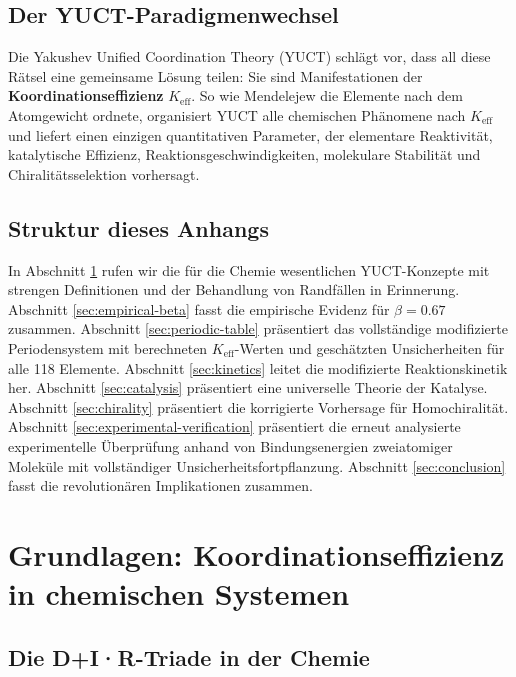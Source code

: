 \documentclass[12pt,a4paper]{article}
\newcommand{\Keff}{K_{\mathrm{eff}}}
\begin{document}
	\subsection{Der YUCT-Paradigmenwechsel}
	
	Die Yakushev Unified Coordination Theory (YUCT) schlägt vor, dass all diese Rätsel eine gemeinsame Lösung teilen: Sie sind Manifestationen der \textbf{Koordinationseffizienz} $\Keff$. So wie Mendelejew die Elemente nach dem Atomgewicht ordnete, organisiert YUCT alle chemischen Phänomene nach $\Keff$ und liefert einen einzigen quantitativen Parameter, der elementare Reaktivität, katalytische Effizienz, Reaktionsgeschwindigkeiten, molekulare Stabilität und Chiralitätsselektion vorhersagt.
	
	\subsection{Struktur dieses Anhangs}
	
	In Abschnitt \ref{sec:foundations} rufen wir die für die Chemie wesentlichen YUCT-Konzepte mit strengen Definitionen und der Behandlung von Randfällen in Erinnerung. Abschnitt \ref{sec:empirical-beta} fasst die empirische Evidenz für $\beta = 0.67$ zusammen. Abschnitt \ref{sec:periodic-table} präsentiert das vollständige modifizierte Periodensystem mit berechneten $\Keff$-Werten und geschätzten Unsicherheiten für alle 118 Elemente. Abschnitt \ref{sec:kinetics} leitet die modifizierte Reaktionskinetik her. Abschnitt \ref{sec:catalysis} präsentiert eine universelle Theorie der Katalyse. Abschnitt \ref{sec:chirality} präsentiert die korrigierte Vorhersage für Homochiralität. Abschnitt \ref{sec:experimental-verification} präsentiert die erneut analysierte experimentelle Überprüfung anhand von Bindungsenergien zweiatomiger Moleküle mit vollständiger Unsicherheitsfortpflanzung. Abschnitt \ref{sec:conclusion} fasst die revolutionären Implikationen zusammen.
	
	\section{Grundlagen: Koordinationseffizienz in chemischen Systemen}
	\label{sec:foundations}
	
	\subsection{Die D+I·R-Triade in der Chemie}
	
\end{document}
